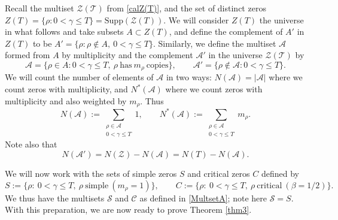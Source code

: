 \documentclass[11pt]{amsart}
\theoremstyle{remark}
\theoremstyle{plain}
\numberwithin{equation}{section}
\begin{document}
Recall the multiset $\mathcal{Z(T)}$ from \eqref{calZ(T)}, and the set of distinct zeros $Z(T)= \{\rho: 0<\gamma\le T\} =\text{Supp}(\mathcal{Z}(T))$. We will consider $Z(T)$ the universe in what follows and take subsets $A\subset Z(T)$, and define the complement of $A'$ in $Z(T)$ to be
$A'= \{\rho: \rho\notin A,\ 0<\gamma\le T\}$. Similarly, we define the multiset $\mathcal{A}$ formed from $A$ by multiplicity and the complement $\mathcal{A'}$ in the universe $\mathcal{Z(T)}$ by
\begin{equation} \label{MultsetA} \mathcal{A} =\{ \rho \in A: 0 < \gamma \le T,\ \rho \ \text{has} \ m_\rho\ \text{copies} \}, \qquad \mathcal{A'} =\{ \rho \notin \mathcal{A}: 0 < \gamma \le T\}. \end{equation}
We will count the number of elements of $\mathcal{A}$ in two ways: $N(\mathcal{A})= |\mathcal{A}|$ where we count zeros with multiplicity, and $N^*(\mathcal{A})$ where we count zeros with multiplicity and also weighted by $m_\rho$. Thus
\begin{equation} \label{N,N*} N(\mathcal{A}) := \sum_{\substack{\rho \in \mathcal{A}\\ 0<\gamma \le T}}1, \qquad N^*(\mathcal{A}) := \sum_{\substack{\rho \in \mathcal{A}\\ 0<\gamma \le T}}m_\rho .\end{equation}
Note also that
\[ N(\mathcal{A'}) = N(\mathcal{Z}) - N(\mathcal{A})=N(T) - N(\mathcal{A}) .\]

We will now work with the sets of simple zeros $S$ and critical zeros $C$ defined by
\begin{equation} \label{S,C}
S := \{ \rho :\ 0<\gamma \le T,\ \rho\ \text{simple}\ (m_\rho=1)\}, \qquad C:= \{ \rho : \ 0<\gamma \le T, \ \rho \ \text{critical}\ (\beta=1/2)\}.\end{equation}
We thus have the multisets $\mathcal{S}$ and $\mathcal{C}$ as defined in \eqref{MultsetA}; note here $\mathcal{S}=S$.
With this preparation, we are now ready to prove Theorem \ref{thm3}.
\end{document}

